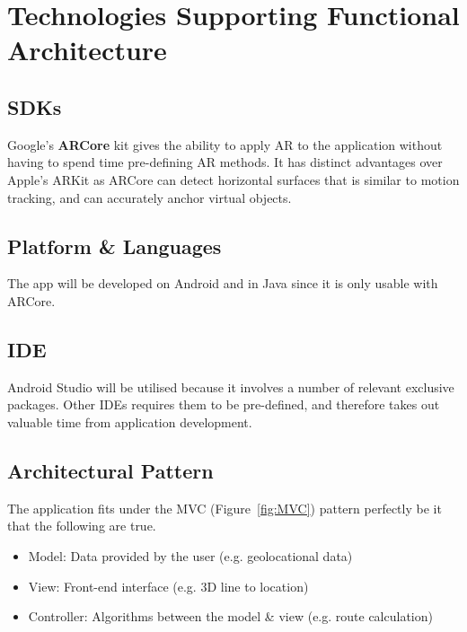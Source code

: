 
{
\section{Technologies Supporting Functional Architecture}

\subsection*{SDKs}
Google's \textbf{ARCore} kit gives the ability to apply AR to the application without having to spend time pre-defining AR methods. It has distinct advantages over Apple's ARKit as ARCore can detect horizontal surfaces that is similar to motion tracking, and can accurately anchor virtual objects. \cite{newgenapps}

\subsection*{Platform \& Languages}
The app will be developed on Android and in Java since it is only usable with ARCore.

\subsection*{IDE}
Android Studio will be utilised because it involves a number of relevant exclusive packages. Other IDEs requires them to be pre-defined, and therefore takes out valuable time from application development.

\subsection*{Architectural Pattern}
The application fits under the MVC (Figure~\ref{fig:MVC}) pattern perfectly be it that the following are true.
\begin{itemize}
    \item Model: Data provided by the user (e.g. geolocational data)
    \item View: Front-end interface (e.g. 3D line to location)
    \item Controller: Algorithms between the model \& view (e.g. route calculation)
\end{itemize}

}
